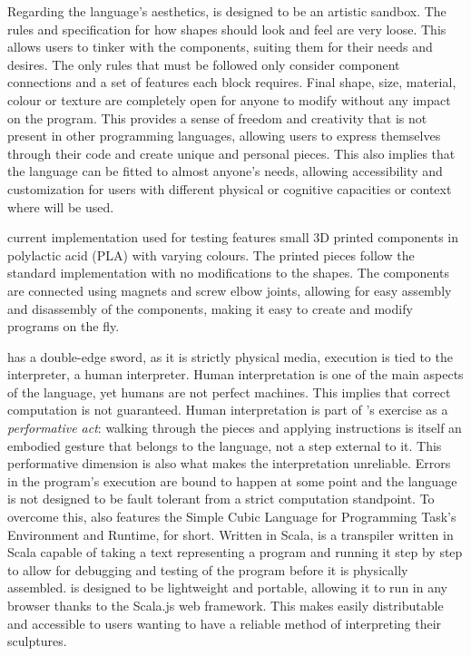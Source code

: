 Regarding the language's aesthetics, \sculpt is designed to be an artistic sandbox. The rules and specification for how shapes should look and feel are very loose. This allows users to tinker with the components, suiting them for their needs and desires.
The only rules that must be followed only consider component connections and a set of features each block requires. Final shape, size, material, colour or texture are completely open for anyone to modify without any impact on the program.
This provides a sense of freedom and creativity that is not present in other programming languages, allowing users to express themselves through their code and create unique and personal pieces.
This also implies that the language can be fitted to almost anyone's needs, allowing accessibility and customization for users with different physical or cognitive capacities or context where \sculpt will be used.

\sculpt current implementation used for testing features small 3D printed components in polylactic acid (PLA) with varying colours.
The printed pieces follow the standard \sculpt implementation with no modifications to the shapes.
The components are connected using magnets and screw elbow joints, allowing for easy assembly and disassembly of the components, making it easy to create and modify programs on the fly.

\sculpt has a double-edge sword, as it is strictly physical media, execution is tied to the interpreter, a human interpreter.
Human interpretation is one of the main aspects of the language, yet humans are not perfect machines. This implies that correct computation is not guaranteed.
Human interpretation is part of \sculpt's exercise as a \emph{performative act}: walking through the pieces and applying instructions is itself an embodied gesture that belongs to the language, not a step external to it.
This performative dimension is also what makes the interpretation unreliable.
Errors in the program's execution are bound to happen at some point and the language is not designed to be fault tolerant from a strict computation standpoint.
To overcome this, \sculpt also features the Simple Cubic Language for Programming Task's Environment and Runtime, \sculpter for short.
Written in Scala, \sculpter is a transpiler written in Scala capable of taking a text representing a \sculpt program and running it step by step to allow for debugging and testing of the program before it is physically assembled.
\sculpter is designed to be lightweight and portable, allowing it to run in any browser thanks to the Scala.js web framework. This makes easily distributable and accessible to users wanting to have a reliable method of interpreting their sculptures.

